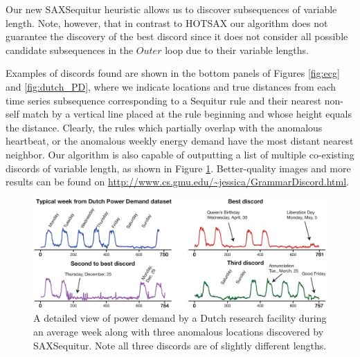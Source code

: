 \documentclass{llncs}
\begin{document}
Our new SAXSequitur heuristic allows us to discover subsequences of variable length. Note, however, that in contrast to HOTSAX our algorithm does not guarantee the discovery of the best discord since it does not consider all possible candidate subsequences in the $Outer$ loop due to their variable lengths.

Examples of discords found are shown in the bottom panels of Figures \ref{fig:ecg} and \ref{fig:dutch_PD}, where we indicate locations and true distances from each time series subsequence corresponding to a Sequitur rule and their nearest non-self match by a vertical line placed at the rule beginning and whose height equals the distance. Clearly, the rules which partially overlap with the anomalous heartbeat, or the anomalous weekly energy demand have the most distant nearest neighbor. Our algorithm is also capable of outputting a list of multiple co-existing discords of variable length, as shown in Figure \ref{fig:dutch_PD2}. Better-quality images and more results can be found on \url{http://www.cs.gmu.edu/~jessica/GrammarDiscord.html}.

\begin{figure}[!t]
 \vspace{-0.3cm}
 \centering
 \includegraphics[width=120mm]{DutchPD_new1.eps}
 \caption{A detailed view of power demand by a Dutch research facility during an average week along with three anomalous locations discovered by SAXSequitur. Note all three discords are of slightly different lengths.}
 \label{fig:dutch_PD2}
 \vspace{-0.3cm}
\end{figure}
\end{document}
